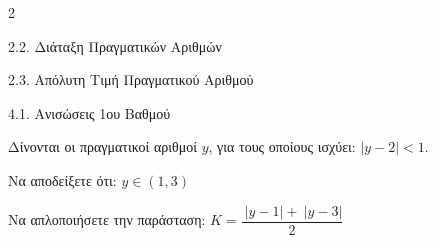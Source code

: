 \begin{ylh}{2}
    \item 2.2. Διάταξη Πραγματικών Αριθμών
    \item 2.3. Απόλυτη Τιμή Πραγματικού Αριθμού
    \item 4.1. Ανισώσεις 1ου Βαθμού
\end{ylh}
Δίνονται οι πραγματικοί αριθμοί $y$, για τους οποίους ισχύει: $|y - 2| < 1$.
\begin{alist}
\item Να αποδείξετε ότι: $y \in (1,3)$
\item Να απλοποιήσετε την παράσταση: $K = \dfrac{\ |y - 1| + \ |y - 3|}{2}$
\end{alist}

